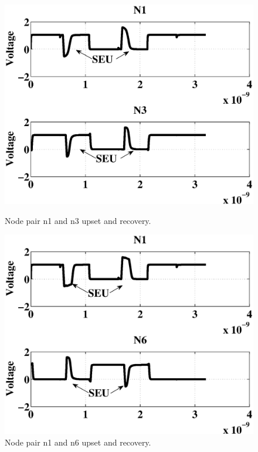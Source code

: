 \begin{figure}[!htbp]
\centering
\parbox{4cm}{
\includegraphics[width=\linewidth]{Figures/WavePlots/n1n3.eps}
\caption{Node pair n1 and n3 upset and recovery.}
\label{fig:n1n3}}
\qquad
\begin{minipage}{4cm}
\includegraphics[width=\linewidth]{Figures/WavePlots/n1n6.eps}
\caption{Node pair n1 and n6 upset and recovery.}
\label{fig:n1n6}
\end{minipage}
\end{figure}

